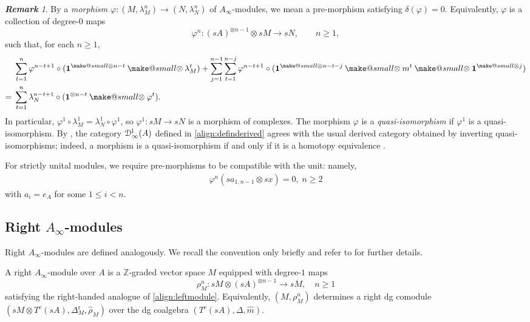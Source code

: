 \documentclass[a4paper, 11pt]{amsart}
\makeatletter
\theoremstyle{definition}
\theoremstyle{remark}
\newtheorem{rem}[thm]{\bf Remark}
\numberwithin{equation}{section}
\newcommand{\LL}{\mathrm{l}}
\newcommand{\RR}{\mathrm{r}}
\newcommand{\ED}{\EuScript{D}}
\newcommand{\smallotimes}{\mathbin{\mathpalette\make@small\otimes}}
\newcommand{\make@small}[2]{%
  \vcenter{\hbox{%
    $\m@th\ifx#1\displaystyle\scriptstyle\else\ifx#1\textstyle\scriptstyle
     \else\scriptscriptstyle\fi\fi#2$%
  }}%
}
\makeatother
\begin{document}
\begin{rem}
By a {\it morphism} $\varphi\colon (M,\lambda_M^n)\to (N,\lambda_N^n)$ of $A_\infty$-modules, we mean a pre-morphism satisfying $\delta(\varphi)=0$. Equivalently, $\varphi$ is a collection of degree-$0$ maps
\[
\varphi^n\colon (sA)^{\otimes n-1}\otimes sM\to sN,
\qquad n\geq 1,
\]
such that, for each $n\geq 1$,
\begin{align}\label{align:modulemorphism}
\begin{aligned}
&\sum_{t=1}^{n} \varphi^{n-t+1}\circ (\mathbf{1}^{\smallotimes
n-t}\smallotimes \lambda_M^t ) + \sum_{j=1}^{n-1}\sum_{t=1}^{n-j} \varphi^{n-t+1}\circ (\mathbf{1}^{\smallotimes
n-t-j}\smallotimes m^t\smallotimes \mathbf{1}^{\smallotimes j})\\
={} & \sum_{t=1}^{n} \lambda_N^{n-t+1} \circ (\mathbf 1^{\otimes n-t} \smallotimes \varphi^{t} ).
\end{aligned}
\end{align}
In particular, $\varphi^1\circ \lambda_M^1=\lambda_N^1\circ \varphi^1$, so $\varphi^1\colon sM\to sN$ is a morphism of complexes.
The morphism $\varphi$ is a {\it quasi-isomorphism} if $\varphi^1$ is a quasi-isomorphism. By \cite[Subsection 4.2]{Kel01}, the category $\ED^{\LL}_{\infty}(A)$ defined in \eqref{align:definderived} agrees with the usual derived category obtained by inverting quasi-isomorphisms; indeed, a morphism is a quasi-isomorphism if and only if it is a homotopy equivalence \cite[Theorem 4.2.1]{Kel01}.

For strictly unital modules, we require pre-morphisms to be compatible with the unit: namely,
\begin{align}
\varphi^n( sa_{1,n-1}\otimes sx)=0, \; n\geq 2
\end{align}
with $a_i=e_A$ for some $1\leq i <n$.
\end{rem}


\subsection{Right \texorpdfstring{$A_{\infty}$}{}-modules}
Right $A_\infty$-modules are defined analogously. We recall the convention only briefly and refer to \cite[Section 4]{Kel01} for further details.

A right $A_\infty$-module over $A$ is a $\mathbb Z$-graded vector space $M$ equipped with degree-$1$ maps
\[
\rho_M^n \colon sM \otimes (sA)^{\otimes n-1} \to sM, \quad n \geq 1
\]
satisfying the right-handed analogue of \eqref{align:leftmodule}. Equivalently, $(M,\rho_M^n)$ determines a right dg comodule $(sM\otimes T^c(sA),\Delta_M^{\RR},\widehat\rho_M)$ over the dg coalgebra $(T^c(sA),\Delta,\widehat m)$.
\end{document}
